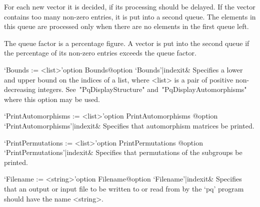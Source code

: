For each new vector it is decided, if its processing should  be  delayed.
If the vector contains too many non-zero entries, it is put into a second
queue. The elements in this queue are processed only when  there  are  no
elements in the first queue left.

The queue factor is a percentage figure. A vector is put into the  second
queue if the percentage of its non-zero entries exceeds the queue factor.

\>`Bounds := <list>'{option Bounds}@{option `Bounds'|indexit}&
Specifies a lower and upper bound on the indices of a list, where  <list>
is a pair of positive non-decreasing  integers.  See~"PqDisplayStructure"
and~"PqDisplayAutomorphisms" where this option may be used.

\>`PrintAutomorphisms := <list>'{option PrintAutomorphisms}%
@{option `PrintAutomorphisms'|indexit}&
Specifies that automorphism matrices be printed.

\>`PrintPermutations := <list>'{option PrintPermutations}%
@{option `PrintPermutations'|indexit}&
Specifies that permutations of the subgroups be printed.

\>`Filename := <string>'{option Filename}@{option `Filename'|indexit}&
Specifies that an output or input file to be written to or read  from  by
the `pq' program should have the name <string>.

\enditems


